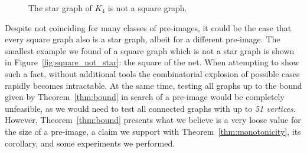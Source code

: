 \begin{figure}[!htb]
        \centering
        \caption{The star graph of $K_4$ is not a square graph.\label{fig:star_not_square}}
\end{figure}

Despite not coinciding for many classes of pre-images, it could be the case that every square graph also is a star graph, albeit for a different pre-image.
The smallest example we found of a square graph which is not a star graph is shown in Figure~\ref{fig:square_not_star}: the square of the net.
When attempting to show such a fact, without additional tools the combinatorial explosion of possible cases rapidly becomes intractable.
At the same time, testing all graphs up to the bound given by Theorem~\ref{thm:bound} in search of a pre-image would be completely unfeasible, as we would need to test all connected graphs with up to \textit{51 vertices}.
However, Theorem~\ref{thm:bound} presents what we believe is a very loose value for the size of a pre-image, a claim we support with Theorem~\ref{thm:monotonicity}, its corollary, and some experiments we performed.


